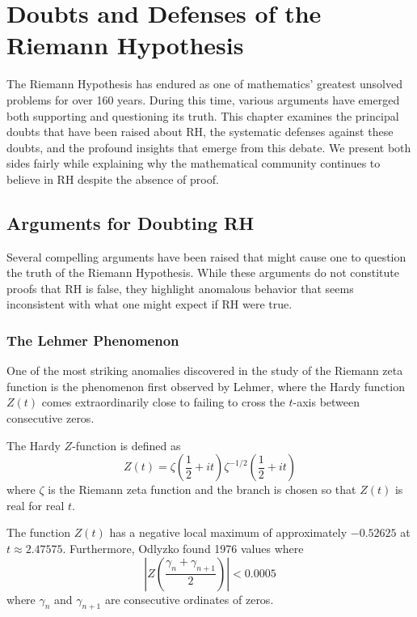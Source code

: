 \chapter{Doubts and Defenses of the Riemann Hypothesis}
\label{ch:doubts_defenses}

The Riemann Hypothesis has endured as one of mathematics' greatest unsolved problems for over 160 years. During this time, various arguments have emerged both supporting and questioning its truth. This chapter examines the principal doubts that have been raised about RH, the systematic defenses against these doubts, and the profound insights that emerge from this debate. We present both sides fairly while explaining why the mathematical community continues to believe in RH despite the absence of proof.

\section{Arguments for Doubting RH}
\label{sec:doubts}

Several compelling arguments have been raised that might cause one to question the truth of the Riemann Hypothesis. While these arguments do not constitute proofs that RH is false, they highlight anomalous behavior that seems inconsistent with what one might expect if RH were true.

\subsection{The Lehmer Phenomenon}
\label{subsec:lehmer}

One of the most striking anomalies discovered in the study of the Riemann zeta function is the phenomenon first observed by Lehmer, where the Hardy function $Z(t)$ comes extraordinarily close to failing to cross the $t$-axis between consecutive zeros.

\begin{definition}
The Hardy $Z$-function is defined as
\begin{equation}
Z(t) = \zeta\left(\frac{1}{2} + it\right) \zeta^{-1/2}\left(\frac{1}{2} + it\right)
\end{equation}
where $\zeta$ is the Riemann zeta function and the branch is chosen so that $Z(t)$ is real for real $t$.
\end{definition}

\begin{theorem}
The function $Z(t)$ has a negative local maximum of approximately $-0.52625$ at $t \approx 2.47575$. Furthermore, Odlyzko found 1976 values where 
\begin{equation}
\left|Z\left(\frac{\gamma_n + \gamma_{n+1}}{2}\right)\right| < 0.0005
\end{equation}
where $\gamma_n$ and $\gamma_{n+1}$ are consecutive ordinates of zeros.
\end{theorem}

